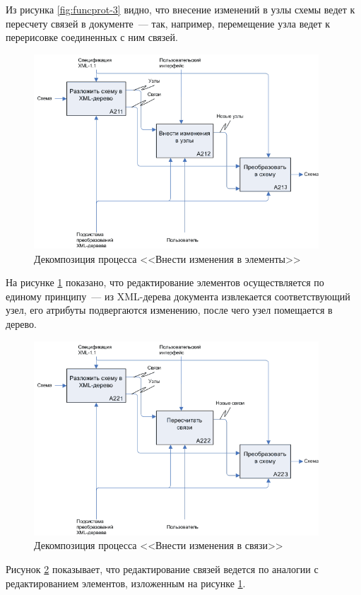 Из рисунка \ref{fig:funcprot-3} видно, что внесение изменений в узлы схемы ведет к пересчету связей в документе~--- так, например, перемещение узла ведет к перерисовке соединенных с ним связей.

\begin{figure}[H]
  \centering
  \includegraphics[width=0.95\textwidth]{diagrams/idef/a21-b.png}
  \caption{Декомпозиция процесса <<Внести изменения в элементы>>}
  \label{fig:funcprot-4}
\end{figure}

На рисунке \ref{fig:funcprot-4} показано, что редактирование элементов осуществляется по единому принципу~--- из XML-дерева документа извлекается соответствующий узел, его атрибуты подвергаются изменению, после чего узел помещается в дерево.

\begin{figure}[H]
  \centering
  \includegraphics[width=0.95\textwidth]{diagrams/idef/a22-b.png}
  \caption{Декомпозиция процесса <<Внести изменения в связи>>}
  \label{fig:funcprot-5}
\end{figure}

Рисунок \ref{fig:funcprot-5} показывает, что редактирование связей ведется по аналогии с редактированием элементов, изложенным на рисунке \ref{fig:funcprot-4}.